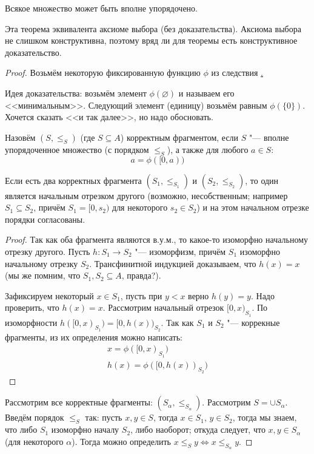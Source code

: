 \begin{theorem}[Цермелло]
	Всякое множество может быть вполне упорядочено.
\end{theorem}
\begin{Rem}
	Эта теорема эквивалента аксиоме выбора (без доказательства).
	Аксиома выбора не слишком конструктивна, поэтому вряд ли для теоремы есть конструктивное доказательство.
\end{Rem}
\begin{proof}
	Возьмём некоторую фиксированную функцию $\phi$ из следствия \href{axiom_of_choice_phi}.

	Идея доказательства: возьмём элемент $\phi(\varnothing)$ и называем его <<минимальным>>.
	Следующий элемент (единицу) возьмём равным $\phi(\{ 0 \})$.
	Хочется сказать <<и так далее>>, но надо обосновать.

	\begin{Def}
		Назовём $(S, \le_S)$ (где $S \subseteq A$) корректным фрагментом,
		если $S$ "--- вполне упорядоченное множество (с порядком $\le_S$), а также для любого $a \in S$:
		\[ a = \phi([0, a)) \]
	\end{Def}
	\begin{lemma}
		Если есть два корректных фрагмента $(S_1, \le_{S_1})$ и $(S_2, \le_{S_2})$,
		то один является начальным отрезком другого (возможно, несобственным; например $S_1 \subseteq S_2$, причём
		$S_1=[0,s_2)$ для некоторого $s_2 \in S_2$) и на этом начальном отрезке порядки согласованы.
	\end{lemma}
	\begin{proof}
		Так как оба фрагмента являются в.у.м., то какое-то изоморфно начальному отрезку другого.
		Пусть $h \colon S_1 \to S_2$ "--- изоморфизм, причём $S_1$ изоморфно начальному отрезку $S_2$.
		Трансфинитной индукцией доказываем, что $h(x)=x$ (мы же помним, что $S_1, S_2 \subseteq A$, правда?).

		Зафиксируем некоторый $x \in S_1$, пусть при $y < x$ верно $h(y)=y$.
		Надо проверить, что $h(x)=x$.
		Рассмотрим начальный отрезок $[0, x)_{S_1}$.
		По изоморфности $h([0, x)_{S_1}) = [0, h(x))_{S_2}$.
		Так как $S_1$ и $S_2$ "--- коррекные фрагменты, из их определения можно написать:
		\begin{gather*}
			x = \phi([0, x)_{S_1}) \\
			h(x) = \phi([0, h(x))_{S_2})
		\end{gather*}
		\TODO
	\end{proof}

	Рассмотрим все корректные фрагменты: $(S_\alpha, \le_{S_\alpha})$.
	Рассмотрим $S = \cup S_\alpha$.
	Введём порядок $\le_S$ так: пусть $x, y \in S$,
	тогда $x \in S_1$, $y \in S_2$, тогда мы знаем, что либо $S_1$ изоморфно началу $S_2$,
	либо наоборот; откуда следует, что $x, y \in S_\alpha$ (для некоторого $\alpha$).
	Тогда можно определить $x \le_S y \iff x \le_{S_\alpha} y$.


\end{proof}
